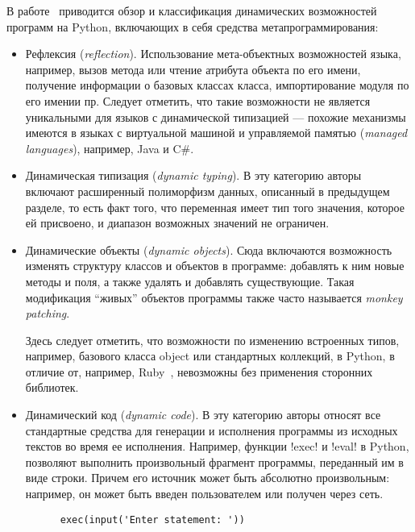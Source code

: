 В работе~\cite[]{Holkner2009} приводится обзор и классификация динамических
возможностей программ на Python, включающих в себя средства
метапрограммирования: 

\begin{itemize}
  \item{%
      Рефлексия (\emph{reflection}). 
      Использование мета-объектных возможностей языка, например,
      вызов метода или чтение атрибута объекта по его имени, получение
      информации о базовых классах класса, импортирование модуля по его имении
      пр. Следует отметить, что такие возможности не является уникальными для
      языков с динамической типизацией --- похожие механизмы имеются в языках с
      виртуальной машиной и управляемой памятью (\emph{managed languages}),
      например, Java и C\#.
    }
  \item{%
      Динамическая типизация (\emph{dynamic typing}). 
      В эту категорию авторы включают расширенный полиморфизм данных, описанный
      в предыдущем разделе, то есть факт того, что переменная имеет тип того
      значения, которое ей присвоено, и диапазон возможных значений не
      ограничен.
    }
  \item{%
      Динамические объекты (\emph{dynamic objects}).
      Сюда включаются возможность изменять структуру классов и объектов в
      программе: добавлять к ним новые методы и поля, а также удалять и добавлять
      существующие. Такая модификация ``живых'' объектов программы также часто
      называется \emph{monkey patching}.

      Здесь следует отметить, что возможности по изменению встроенных
      типов, например, базового класса object или стандартных коллекций, в Python, в
      отличие от, например, Ruby~\cite{Madsen2007}, невозможны без применения сторонних библиотек.
    }
  \item{  
      Динамический код (\emph{dynamic code}).
      В эту категорию авторы относят все стандартные средства для генерации и
      исполнения программы из исходных текстов во время ее исполнения.
      Например, функции !exec! и !eval! в Python, позволяют выполнить
      произвольный фрагмент программы, переданный им в виде строки.  Причем его
      источник может быть абсолютно произвольным: например, он может быть введен
      пользователем или получен через сеть.

      \begin{lstlisting}
      exec(input('Enter statement: '))  
      \end{lstlisting}

}
\end{itemize}
